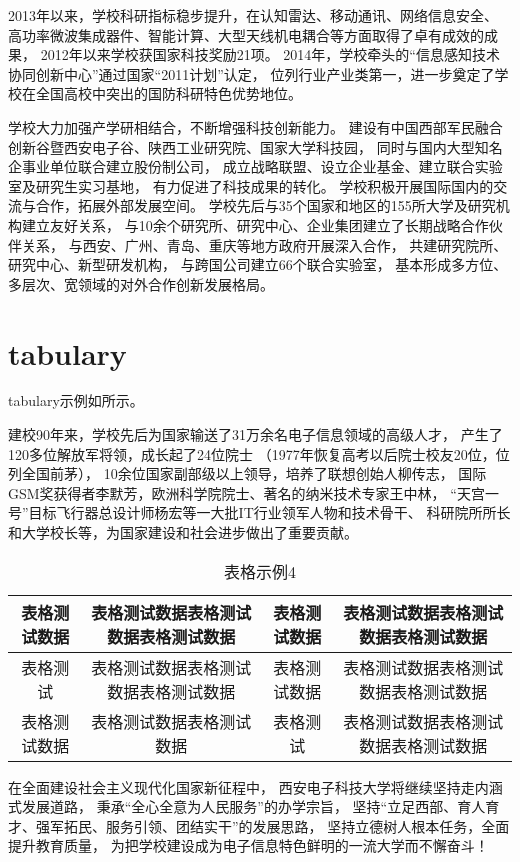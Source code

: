 2013年以来，学校科研指标稳步提升，在认知雷达、移动通讯、网络信息安全、
高功率微波集成器件、智能计算、大型天线机电耦合等方面取得了卓有成效的成果，
2012年以来学校获国家科技奖励21项。
2014年，学校牵头的“信息感知技术协同创新中心”通过国家“2011计划”认定，
位列行业产业类第一，进一步奠定了学校在全国高校中突出的国防科研特色优势地位。
\par
学校大力加强产学研相结合，不断增强科技创新能力。
建设有中国西部军民融合创新谷暨西安电子谷、陕西工业研究院、国家大学科技园，
同时与国内大型知名企事业单位联合建立股份制公司，
成立战略联盟、设立企业基金、建立联合实验室及研究生实习基地，
有力促进了科技成果的转化。
学校积极开展国际国内的交流与合作，拓展外部发展空间。
学校先后与35个国家和地区的155所大学及研究机构建立友好关系，
与10余个研究所、研究中心、企业集团建立了长期战略合作伙伴关系，
与西安、广州、青岛、重庆等地方政府开展深入合作，
共建研究院所、研究中心、新型研发机构，
与跨国公司建立66个联合实验室，
基本形成多方位、多层次、宽领域的对外合作创新发展格局。
\section{tabulary}
tabulary示例如所示。
\par
建校90年来，学校先后为国家输送了31万余名电子信息领域的高级人才，
产生了120多位解放军将领，成长起了24位院士
（1977年恢复高考以后院士校友20位，位列全国前茅），
10余位国家副部级以上领导，培养了联想创始人柳传志，
国际GSM奖获得者李默芳，欧洲科学院院士、著名的纳米技术专家王中林，
“天宫一号”目标飞行器总设计师杨宏等一大批IT行业领军人物和技术骨干、
科研院所所长和大学校长等，为国家建设和社会进步做出了重要贡献。
\begin{table}
\renewcommand{\arraystretch}{1.5}
\caption{表格示例4}
\label{tab4}
\centering
\begin{tabulary}{\linewidth}{cCcC}
\toprule
表格测试数据 & 表格测试数据表格测试数据表格测试数据 & 表格测试数据 & 表格测试数据表格测试数据表格测试数据 \\ \hline
表格测试 & 表格测试数据表格测试数据表格测试数据 & 表格测试数据 & 表格测试数据表格测试数据表格测试数据 \\ \hline
表格测试数据 & 表格测试数据表格测试数据 & 表格测试 & 表格测试数据表格测试数据表格测试数据 \\ \hline
\bottomrule
\end{tabulary}
\end{table}
\par
在全面建设社会主义现代化国家新征程中，
西安电子科技大学将继续坚持走内涵式发展道路，
秉承“全心全意为人民服务”的办学宗旨，
坚持“立足西部、育人育才、强军拓民、服务引领、团结实干”的发展思路，
坚持立德树人根本任务，全面提升教育质量，
为把学校建设成为电子信息特色鲜明的一流大学而不懈奋斗！
